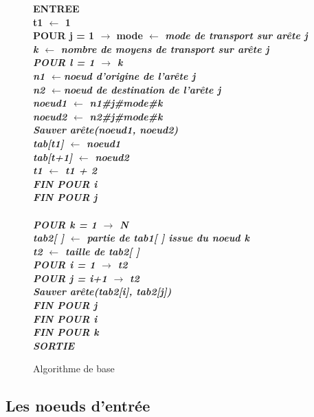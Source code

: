 \begin{center}
\begin{figure}[htbp]
{\begin{minipage}{20cm}
\begin{tabbing}
\bf {ENTREE}\\
t1 $\leftarrow$ 1\\
\bf {POUR } j = 1 $\rightarrow$ mode $\leftarrow$ \it{mode de transport sur arête j}\\
\> k $\leftarrow$ \it {nombre de moyens de transport sur arête j}\\
\> \bf {POUR} l = 1 $\rightarrow$ k\\
\> \>  n1 $\leftarrow$\it {noeud d'origine de l'arête j}\\
\> \> n2 $\leftarrow$\it {noeud de destination de l'arête j}\\
\> \> noeud1 $\leftarrow$ n1\#j\#mode\#k\\
\> \>  noeud2 $\leftarrow$ n2\#j\#mode\#k\\
\> \>  \it { Sauver arête(noeud1, noeud2)}\\
\> \> tab[t1] $\leftarrow$ noeud1\\
\> \>  tab[t+1] $\leftarrow$ noeud2\\
\> \> t1 $\leftarrow$ t1 + 2\\
\>  \bf {FIN POUR} i\\
\bf {FIN POUR} j\\
\\
\bf {POUR} k = 1 $\rightarrow$ N\\
\> tab2[ ] $\leftarrow$ \it{partie de tab1[ ] issue du noeud k}\\
\> t2 $\leftarrow$ \it {taille de tab2[ ]}\\
\> \bf{POUR}  i = 1 $\rightarrow$ t2\\
\> \> \bf{POUR} j = i+1 $\rightarrow$ t2\\
\> \> \> \it{Sauver arête(tab2[i], tab2[j])}\\
\> \> \bf{FIN POUR} j\\
\> \bf {FIN POUR} i\\
\bf {FIN POUR} k\\
\bf {SORTIE}\\
\end{tabbing}
\end{minipage}
}
\caption{\label{algo1} Algorithme de base}
\end{figure}
\end{center}



\subsection{Les noeuds d'entr\'ee}



